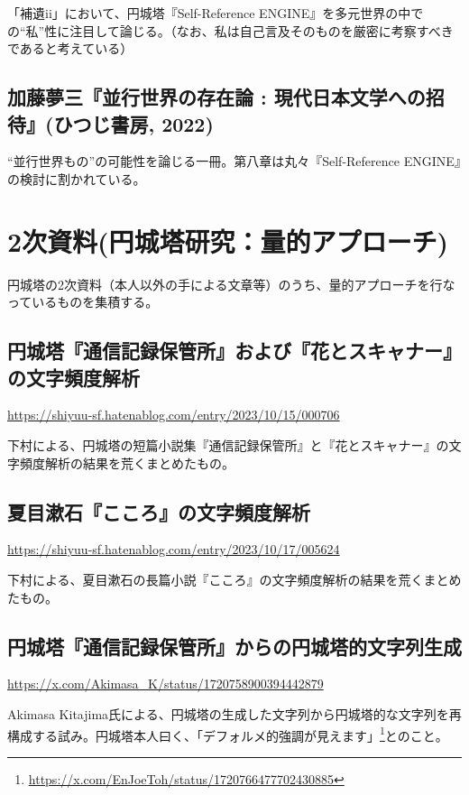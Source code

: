 \documentclass[10pt, a5paper, twoside]{jsarticle}
\theoremstyle{definition}
\begin{document}
			「補遺ii」において、円城塔『Self-Reference ENGINE』を多元世界の中での“私”性に注目して論じる。（なお、私は自己言及そのものを厳密に考察すべきであると考えている）

		\subsection{加藤夢三『並行世界の存在論 : 現代日本文学への招待』(ひつじ書房, 2022)}

			“並行世界もの”の可能性を論じる一冊。第八章は丸々『Self-Reference ENGINE』の検討に割かれている。

	\section{2次資料(円城塔研究：量的アプローチ)}

		円城塔の2次資料（本人以外の手による文章等）のうち、量的アプローチを行なっているものを集積する。

		\subsection{円城塔『通信記録保管所』および『花とスキャナー』の文字頻度解析}

			\url{https://shiyuu-sf.hatenablog.com/entry/2023/10/15/000706}

			下村による、円城塔の短篇小説集『通信記録保管所』と『花とスキャナー』の文字頻度解析の結果を荒くまとめたもの。

		\subsection{夏目漱石『こころ』の文字頻度解析}

			\url{https://shiyuu-sf.hatenablog.com/entry/2023/10/17/005624}

			下村による、夏目漱石の長篇小説『こころ』の文字頻度解析の結果を荒くまとめたもの。

		\subsection{円城塔『通信記録保管所』からの円城塔的文字列生成}

			\url{https://x.com/Akimasa_K/status/1720758900394442879}

			Akimasa Kitajima氏による、円城塔の生成した文字列から円城塔的な文字列を再構成する試み。円城塔本人曰く、「デフォルメ的強調が見えます」\footnote{\url{https://x.com/EnJoeToh/status/1720766477702430885}}とのこと。
\end{document}
